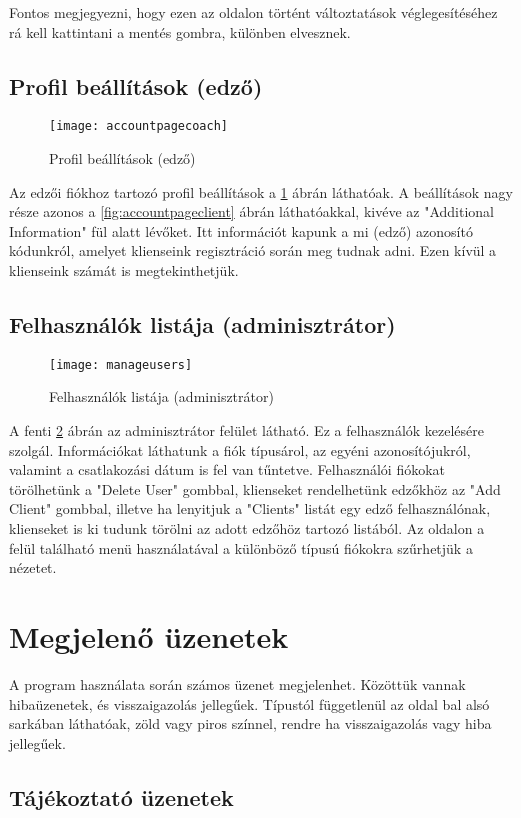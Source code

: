 Fontos megjegyezni, hogy ezen az oldalon történt változtatások véglegesítéséhez rá kell kattintani a mentés gombra, különben elvesznek.

\subsection{Profil beállítások (edző)}

\begin{figure}[H]
	\centering
	\texttt{[image: accountpagecoach]}
	\caption{Profil beállítások (edző)}
	\label{fig:accountpagecoach}
\end{figure}

Az edzői fiókhoz tartozó profil beállítások a \ref{fig:accountpagecoach} ábrán láthatóak. A beállítások nagy része azonos a \ref{fig:accountpageclient} ábrán láthatóakkal, kivéve az "Additional Information" fül alatt lévőket. Itt információt kapunk a mi (edző) azonosító kódunkról, amelyet klienseink regisztráció során meg tudnak adni. Ezen kívül a klienseink számát is megtekinthetjük.

\subsection{Felhasználók listája (adminisztrátor)}

\begin{figure}[H]
	\centering
	\texttt{[image: manageusers]}
	\caption{Felhasználók listája (adminisztrátor)}
	\label{fig:manageusers}
\end{figure}

A fenti \ref{fig:manageusers} ábrán az adminisztrátor felület látható. Ez a felhasználók kezelésére szolgál. Információkat láthatunk a fiók típusárol, az egyéni azonosítójukról, valamint a csatlakozási dátum is fel van tűntetve. Felhasználói fiókokat törölhetünk a "Delete User" gombbal, klienseket rendelhetünk edzőkhöz az "Add Client" gombbal, illetve ha lenyitjuk a "Clients" listát egy edző felhasználónak, klienseket is ki tudunk törölni az adott edzőhöz tartozó listából. Az oldalon a felül található menü használatával a különböző típusú fiókokra szűrhetjük a nézetet.

\pagebreak

\section{Megjelenő üzenetek}

A program használata során számos üzenet megjelenhet. Közöttük vannak hibaüzenetek, és visszaigazolás jellegűek. Típustól függetlenül az oldal bal alsó sarkában láthatóak, zöld vagy piros színnel, rendre ha visszaigazolás vagy hiba jellegűek.

\subsection{Tájékoztató üzenetek}


